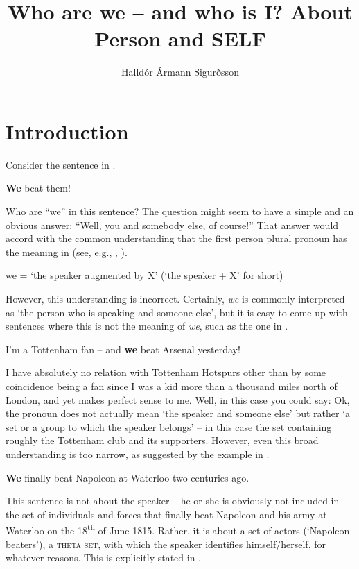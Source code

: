 \documentclass[output=paper]{LSP/langsci}
\author{Halldór Ármann Sigurðsson\affiliation{Lund University}}
\title{Who are we -- and who is I? About Person and SELF}
\begin{document}
\section{Introduction}\label{sec:Sigurdsson:1}

Consider the sentence in .

\ea%
  \label{ex:Sigurdsson:1}
	  \textbf{We} beat them!
\z

Who are “we” in this sentence? The question might seem to have a simple and an obvious answer: “Well, you and somebody else, of course!” That answer would accord with the common understanding that the first person plural pronoun has the meaning in  (see, e.g., \citealt{Cysouw2003}, \citealt[82ff.]{Siewierska2004}).

\ea%
    \label{ex:Sigurdsson:2}
	  we = ‘the speaker augmented by X’ (‘the speaker + X’ for short)
\z

However, this understanding is incorrect. Certainly, \textit{we} is commonly interpreted as ‘the person who is speaking and someone else’, but it is easy to come up with sentences where this is not the meaning of \textit{we}, such as the one in .

\ea%
    \label{ex:Sigurdsson:3}
	   I’m a Tottenham fan – and \textbf{we} beat Arsenal yesterday!
\z


I have absolutely no relation with Tottenham Hotspurs other than by some coincidence being a fan since I was a kid more than a thousand miles north of London, and yet  makes perfect sense to me.  Well, in this case you could say: Ok, the pronoun does not actually mean ‘the speaker and someone else’ but rather ‘a set or a group to which the speaker belongs’ – in this case the set containing roughly the Tottenham club and its supporters. However, even this broad understanding is too narrow, as suggested by the example in .

\ea%
    \label{ex:Sigurdsson:4}
	  \textbf{We} finally beat Napoleon at Waterloo two centuries ago.
\z


This sentence is not about the speaker – he or she is obviously not included in the set of individuals and forces that finally beat Napoleon and his army at Waterloo on the 18\textsuperscript{th} of June 1815. Rather, it is about a set of actors (‘Napoleon beaters’), a \textsc{theta set}, with which the speaker identifies himself\slash herself, for whatever reasons. This is explicitly stated in .
\end{document}
